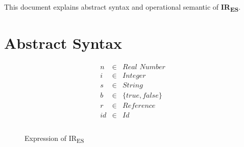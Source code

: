 \documentclass[acmsmall,screen]{acmart}
\newcommand{\irnameb}[0]{\textbf{IR\textsubscript{ES}}\xspace}
\newcommand{\irname}[0]{IR\textsubscript{ES}\xspace}
\begin{document}

This document explains abstract syntax and operational semantic of \irnameb.


\section{Abstract Syntax}

\begin{figure}[t]
\[
\begin{array}{rrl}
n & \in & \textit{Real Number} \\
i & \in & \textit{Integer} \\
s & \in & \textit{String} \\
b & \in & \{\textit{true}, \textit{false}\} \\
r & \in & \textit{Reference} \\
id & \in & \textit{Id} \\
\\
\end{array}
\]
\caption{Expression of \irname}
\label{fig:domain}
\end{figure}
\end{document}

